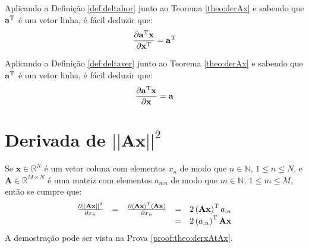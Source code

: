 \begin{corollaryT}\label{coro:derAx3}
Aplicando a Definição \ref{def:deltahor} junto ao Teorema \ref{theo:derAx} e sabendo que $\mathbf{a}^{\mathrm{T}}$
é um vetor linha, é
fácil deduzir que:
\begin{equation}
\frac{\partial \mathbf{a}^{\mathrm{T}}\mathbf{x}}{\partial \mathbf{x}^{\mathrm{T}}}=\mathbf{a}^{\mathrm{T}}
\end{equation}
\end{corollaryT}

\begin{corollaryT}\label{coro:derAx4}
Aplicando a Definição \ref{def:deltaver} junto ao Teorema \ref{theo:derAx} e sabendo que $\mathbf{a}^{\mathrm{T}}$
é um vetor linha, é
fácil deduzir que:
\begin{equation}
\frac{\partial \mathbf{a}^{\mathrm{T}}\mathbf{x}}{\partial \mathbf{x}}=\mathbf{a}
\end{equation}
\end{corollaryT}

\section{Derivada de $||\mathbf{A}\mathbf{x}||^2$ 
}

\begin{theorem}\label{theo:derxAtAx}
Se 
$\mathbf{x}\in \mathbb{R}^N$ é um vetor coluna com elementos $x_n$ de modo que
$n\in \mathbb{N}$, $1 \leq n \leq N$, e 
$\mathbf{A} \in \mathbb{R}^{M\times N}$ é uma matriz com elementos $a_{mn}$ de modo que
$m\in \mathbb{N}$, $1 \leq m \leq M$, então se cumpre que:
\begin{equation}
\begin{matrix}
\frac{\partial ||\mathbf{A}\mathbf{x}||^2 }{\partial x_n}&=&
\frac{\partial \left(\mathbf{A}\mathbf{x}\right)^{\mathrm{T}}\left(\mathbf{A}\mathbf{x}\right)}{\partial x_n}&=&
2\left(\mathbf{A}\mathbf{x}\right)^{\mathrm{T}}a_{:n}\\
~&~&~&=& 2\left(a_{:n}\right)^{\mathrm{T}}\mathbf{A}\mathbf{x}
\end{matrix}
\end{equation}
A demostração pode ser vista na Prova \ref{proof:theo:derxAtAx}.
\end{theorem}

